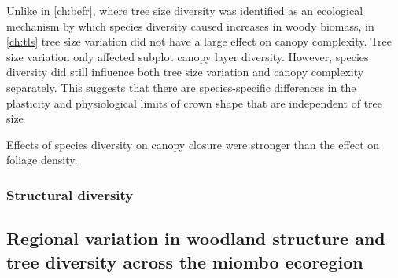 \begin{refsection}
Unlike in \autoref{ch:befr}, where tree size diversity was identified as an ecological mechanism by which species diversity caused increases in woody biomass, in \autoref{ch:tls} tree size variation did not have a large effect on canopy complexity. Tree size variation only affected subplot canopy layer diversity. However, species diversity did still influence both tree size variation and canopy complexity separately. This suggests that there are species-specific differences in the plasticity and physiological limits of crown shape that are independent of tree size

Effects of species diversity on canopy closure were stronger than the effect on foliage density.



\subsubsection{Structural diversity}





\subsection{Regional variation in woodland structure and tree diversity across the miombo ecoregion}


\end{refsection}
